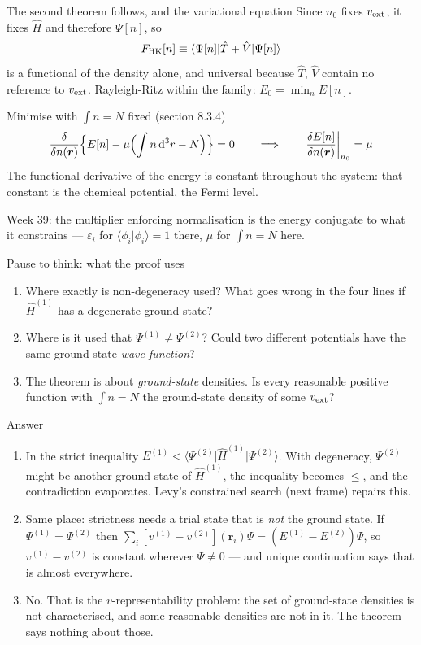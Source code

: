 \documentclass[aspectratio=169,10pt]{beamer}
\newcounter{thinkctr}
\newcommand{\thinkq}[2]{%
  \stepcounter{thinkctr}%
  \vfill
  \begin{tcolorbox}[enhanced,colback=palewarm,colframe=warm,boxrule=1.2pt,arc=4pt,
    grow to left by=6mm,grow to right by=6mm,
    left=16pt,right=16pt,top=16pt,bottom=18pt,
    fonttitle=\bfseries\Large,fontupper=\Large,
    title={Pause to think \#\thethinkctr\hfill\mdseries\normalsize(about #1 min -- discuss with your neighbour)}]
  #2
  \end{tcolorbox}
  \vfill}
\newcommand{\thinka}[1]{%
  \vfill
  \begin{tcolorbox}[enhanced,colback=paleteal,colframe=teal,boxrule=1.2pt,arc=4pt,
    grow to left by=6mm,grow to right by=6mm,
    left=16pt,right=16pt,top=16pt,bottom=18pt,
    fonttitle=\bfseries\Large,fontupper=\large,
    title={Answer to pause \#\thethinkctr}]
  #1
  \end{tcolorbox}
  \vfill}
\newcommand{\mbbox}[1]{%
  \begin{tcolorbox}[colback=paleblue,colframe=uioblue,title={\bfseries Many-body connection}]
  #1
  \end{tcolorbox}}
\newcommand{\braket}[2]{\langle #1\vert #2\rangle}
\newcommand{\element}[3]{\langle #1\vert #2\vert #3\rangle}
\newcommand{\dd}{\mathrm{d}}
\begin{document}
\begin{frame}[shrink=4]{The second theorem follows, and the variational equation}
  \small
  Since $n_0$ fixes $v_{\rm ext}$, it fixes $\hat H$ and therefore $\Psi[n]$, so
  \[
    F_{\rm HK}[n]\equiv\element{\Psi[n]}{\hat T+\hat V}{\Psi[n]}
  \]
  is a functional of the density alone, and universal because $\hat T$, $\hat V$ contain no reference to $v_{\rm ext}$. Rayleigh-Ritz within the family: $E_0=\min_nE[n]$.
  \vspace{0.4em}
  \begin{block}{Minimise with $\int n=N$ fixed (section 8.3.4)}
    \[
      \frac{\delta}{\delta n(\bm r)}\Bigl\{E[n]-\mu\Bigl(\int n\,\dd^3r-N\Bigr)\Bigr\}=0
      \qquad\Longrightarrow\qquad
      \left.\frac{\delta E[n]}{\delta n(\bm r)}\right|_{n_0}=\mu
    \]
    The functional derivative of the energy is constant throughout the system: that constant is the chemical potential, the Fermi level.
  \end{block}
  \mbbox{Week 39: the multiplier enforcing normalisation is the energy conjugate to what it constrains --- $\varepsilon_i$ for $\braket{\phi_i}{\phi_i}=1$ there, $\mu$ for $\int n=N$ here.}
\end{frame}

\begin{frame}{Pause to think: what the proof uses}
  \thinkq{4}{
  \begin{enumerate}
    \item Where exactly is non-degeneracy used? What goes wrong in the four lines if $\hat H^{(1)}$ has a degenerate ground state?
    \item Where is it used that $\Psi^{(1)}\ne\Psi^{(2)}$? Could two different potentials have the same ground-state \emph{wave function}?
    \item The theorem is about \emph{ground-state} densities. Is every reasonable positive function with $\int n=N$ the ground-state density of some $v_{\rm ext}$?
  \end{enumerate}}
\end{frame}

\begin{frame}{Answer}
  \thinka{
  \begin{enumerate}
    \item In the strict inequality $E^{(1)}<\element{\Psi^{(2)}}{\hat H^{(1)}}{\Psi^{(2)}}$. With degeneracy, $\Psi^{(2)}$ might be another ground state of $\hat H^{(1)}$, the inequality becomes $\le$, and the contradiction evaporates. Levy's constrained search (next frame) repairs this.
    \item Same place: strictness needs a trial state that is \emph{not} the ground state. If $\Psi^{(1)}=\Psi^{(2)}$ then $\sum_i[v^{(1)}-v^{(2)}](\bm r_i)\Psi=(E^{(1)}-E^{(2)})\Psi$, so $v^{(1)}-v^{(2)}$ is constant wherever $\Psi\ne0$ --- and unique continuation says that is almost everywhere.
    \item No. That is the $v$-representability problem: the set of ground-state densities is not characterised, and some reasonable densities are not in it. The theorem says nothing about those.
  \end{enumerate}}
\end{frame}
\end{document}
